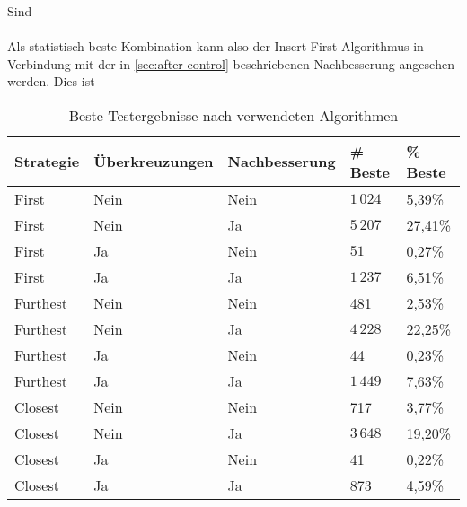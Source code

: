 Sind 
\\\\
Als statistisch beste Kombination kann also der Insert-First-Algorithmus in Verbindung mit der in \vref{sec:after-control} beschriebenen Nachbesserung angesehen werden.
Dies ist 
\begin{center}
    \begin{table}
\begin{tabular}{ l | l | l | l | l }
\textbf{Strategie} & \textbf{Überkreuzungen} & \textbf{Nachbesserung} & \textbf{\# Beste} & \textbf{\% Beste} \\ \hline
First & Nein & Nein & $1\,024$ & 5,39\% \\
First & Nein & Ja & $5\,207$ & 27,41\% \\
First & Ja & Nein & $51$ &  0,27\% \\
First & Ja & Ja & $1\,237$ & 6,51\% \\ \hline
Furthest & Nein & Nein &  481 & 2,53\% \\
Furthest & Nein & Ja & $4\,228$ & 22,25\% \\
Furthest & Ja & Nein & 44 & 0,23\% \\
Furthest & Ja & Ja & $1\,449$ & 7,63\% \\ \hline
Closest & Nein & Nein & 717 & 3,77\% \\
Closest & Nein & Ja & $3\,648$ & 19,20\% \\
Closest & Ja & Nein & 41 & 0,22\% \\
Closest & Ja & Ja & 873 & 4,59\% \\ \hline
\end{tabular}
\caption{Beste Testergebnisse nach verwendeten Algorithmen}
\label{tab:test-results1}
\end{table}
\end{center}
